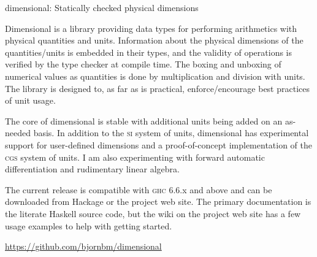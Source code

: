 \begin{hcarentry}{dimensional: Statically checked physical dimensions}
\label{dimensional}
\makeheader

Dimensional is a library providing data types for performing
arithmetics with physical quantities and units. Information about
the physical dimensions of the quantities/units is embedded in their
types, and the validity of operations is verified by the type checker
at compile time. The boxing and unboxing of numerical values as
quantities is done by multiplication and division with units. The
library is designed to, as far as is practical, enforce/encourage
best practices of unit usage.

The core of dimensional is stable with additional units being added
on an as-needed basis. In addition to the \textsc{si} system of
units, dimensional has experimental support for user-defined dimensions
and a proof-of-concept implementation of the \textsc{cgs} system
of units. I am also experimenting with forward automatic differentiation
and rudimentary linear algebra.

The current release is compatible with \textsc{ghc} 6.6.x and
above and can be downloaded from Hackage or the project web site.
The primary documentation is the literate Haskell source code, but
the wiki on the project web site has a few usage examples to help
with getting started.

\FurtherReading
 \url{https://github.com/bjornbm/dimensional}
\end{hcarentry}

